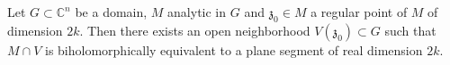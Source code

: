 Let $G \subset \mathbb{C}^n$ be a domain, $M$ analytic in $G$ and $\mathfrak{z}_0 \in M$ a regular point of $M$ of dimension $2k$. Then there exists an open neighborhood $V(\mathfrak{z}_0) \subset G$ such that $M \cap V$ is biholomorphically equivalent to a plane segment of real dimension $2k$.
